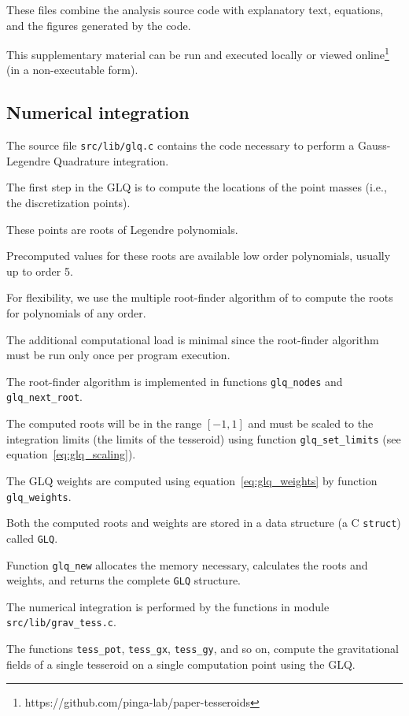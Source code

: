 \documentclass[manuscript]{geophysics}
\begin{document}
These files combine the analysis source code
with explanatory text, equations, and the figures generated by the code.

This supplementary material can be run and executed locally or viewed
online\footnote{https://github.com/pinga-lab/paper-tesseroids}
(in a non-executable form).


\subsection{Numerical integration}

The source file \texttt{src/lib/glq.c} contains the code necessary to perform a
Gauss-Legendre Quadrature integration.

The first step in the GLQ is to compute the
locations of the point masses (i.e., the discretization points).

These points are roots of Legendre polynomials.

Precomputed values for these roots are available low order polynomials,
usually up to order 5.

For flexibility, we use the multiple root-finder algorithm of
\citet{Barrera-Figueroa2006} to compute the roots for polynomials of any order.

The additional computational load is minimal since the root-finder algorithm
must be run only once per program execution.

The root-finder algorithm is implemented in functions \texttt{glq\_nodes} and
\texttt{glq\_next\_root}.

The computed roots will be in the range $[-1, 1]$
and must be scaled to the integration limits (the limits of the tesseroid)
using function \texttt{glq\_set\_limits} (see equation~\ref{eq:glq_scaling}).

The GLQ weights are computed using equation~\ref{eq:glq_weights} by function
\texttt{glq\_weights}.

Both the computed roots and weights are stored in a data structure (a C
\texttt{struct}) called \texttt{GLQ}.

Function \texttt{glq\_new} allocates the memory necessary,
calculates the roots and weights,
and returns the complete \texttt{GLQ} structure.



The numerical integration is performed by the functions in module
\texttt{src/lib/grav\_tess.c}.

The functions \texttt{tess\_pot}, \texttt{tess\_gx}, \texttt{tess\_gy},
and so on, compute the gravitational fields of a single tesseroid on a single
computation point using the GLQ.
\end{document}
